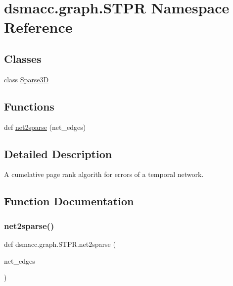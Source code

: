 \hypertarget{namespacedsmacc_1_1graph_1_1STPR}{}\section{dsmacc.\+graph.\+S\+T\+PR Namespace Reference}
\label{namespacedsmacc_1_1graph_1_1STPR}
\subsection*{Classes}
\begin{DoxyCompactItemize}
\item 
class \mbox{\hyperlink{classdsmacc_1_1graph_1_1STPR_1_1Sparse3D}{Sparse3D}}
\end{DoxyCompactItemize}
\subsection*{Functions}
\begin{DoxyCompactItemize}
\item 
def \mbox{\hyperlink{namespacedsmacc_1_1graph_1_1STPR_a46b19dc5e4d4e3aed6315fb1c2d48d65}{net2sparse}} (net\+\_\+edges)
\end{DoxyCompactItemize}


\subsection{Detailed Description}
\begin{DoxyVerb}A cumelative page rank algorith for errors of a temporal network.
\end{DoxyVerb}
 

\subsection{Function Documentation}
\mbox{\label{namespacedsmacc_1_1graph_1_1STPR_a46b19dc5e4d4e3aed6315fb1c2d48d65}} 
\subsubsection{\texorpdfstring{net2sparse()}{net2sparse()}}
{\footnotesize\ttfamily def dsmacc.\+graph.\+S\+T\+P\+R.\+net2sparse (\begin{DoxyParamCaption}\item[{}]{net\+\_\+edges }\end{DoxyParamCaption})}

